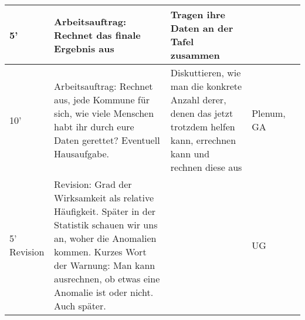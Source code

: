 \documentclass{article}
\begin{document}
\begin{tabularx}{\textwidth}{|X|X|X|X|X|}
5'                            & Arbeitsauftrag: Rechnet das finale Ergebnis aus                                                                                                                                                                                   & Tragen ihre Daten an der Tafel zusammen                                                                                     &                                                                                          &                                                                             \\ \hline
10'                           & Arbeitsauftrag: Rechnet aus, jede Kommune für sich, wie viele Menschen habt ihr durch eure Daten gerettet? Eventuell Hausaufgabe.                                                                                                 & Diskuttieren, wie man die konkrete Anzahl derer, denen das jetzt trotzdem helfen kann, errechnen kann und rechnen diese aus & Plenum, GA                                                                               &                                                                             \\ \hline
5' Revision                   & Revision: Grad der Wirksamkeit als relative Häufigkeit. Später in der Statistik schauen wir uns an, woher die Anomalien kommen. Kurzes Wort der Warnung: Man kann ausrechnen, ob etwas eine Anomalie ist oder nicht. Auch später. &                                                                                                                             & UG                                                                                       &                                                                             \\ \hline
\end{tabularx}
\end{document}
